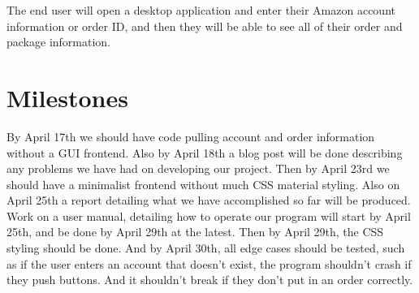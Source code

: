 \documentclass[letter]{article}
\begin{document}
The end user will open a desktop application and enter their Amazon account information or order ID, and then they will be able to see all of their order and package information.

\section*{Milestones}

By April 17th we should have code pulling account and order information without a GUI frontend. Also by April 18th a blog post will be done describing any problems we have had on developing our project. Then by April 23rd we should have a minimalist frontend without much CSS material styling. Also on April 25th a report detailing what we have accomplished so far will be produced. Work on a user manual, detailing how to operate our program will start by April 25th, and be done by April 29th at the latest. Then by April 29th, the CSS styling should be done. And by April 30th, all edge cases should be tested, such as if the user enters an account that doesn't exist, the program shouldn't crash if they push buttons. And it shouldn't break if they don't put in an order correctly.
\end{document}
